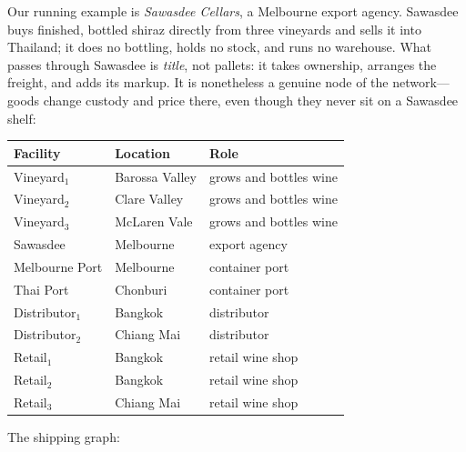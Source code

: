 \documentclass[11pt,a4paper]{article}
\theoremstyle{plain}
\theoremstyle{definition}
\theoremstyle{remark}
\begin{document}
Our running example is \emph{Sawasdee Cellars}, a Melbourne export
agency. Sawasdee buys finished, bottled shiraz directly from three
vineyards and sells it into Thailand; it does no bottling, holds no
stock, and runs no warehouse. What passes through Sawasdee is
\emph{title}, not pallets: it takes ownership, arranges the freight,
and adds its markup. It is nonetheless a genuine node of the
network---goods change custody and price there, even though they
never sit on a Sawasdee shelf:

\begin{center}
\begin{tabular}{lll}
\toprule
Facility & Location & Role \\
\midrule
Vineyard$_1$ & Barossa Valley & grows and bottles wine \\
Vineyard$_2$ & Clare Valley & grows and bottles wine \\
Vineyard$_3$ & McLaren Vale & grows and bottles wine \\
Sawasdee & Melbourne & export agency \\
Melbourne Port & Melbourne & container port \\
Thai Port & Chonburi & container port \\
Distributor$_1$ & Bangkok & distributor \\
Distributor$_2$ & Chiang Mai & distributor \\
Retail$_1$ & Bangkok & retail wine shop \\
Retail$_2$ & Bangkok & retail wine shop \\
Retail$_3$ & Chiang Mai & retail wine shop \\
\bottomrule
\end{tabular}
\end{center}

The shipping graph:

\begin{center}

\end{center}
\end{document}
